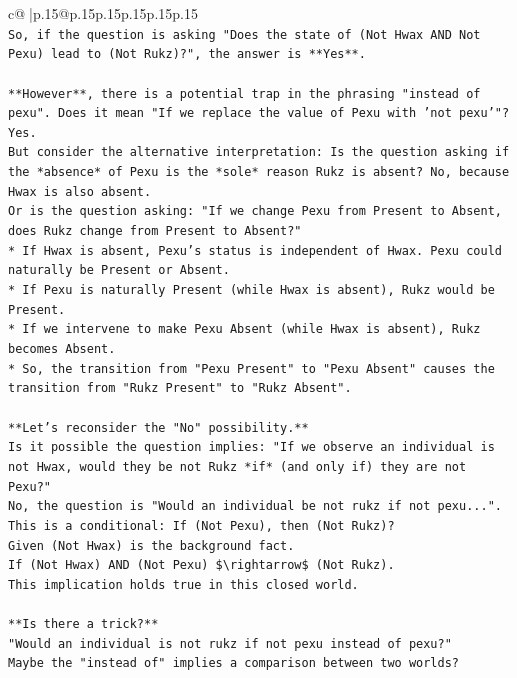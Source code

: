 \documentclass{article}
\begin{document}
{\begin{supertabular}{c@{$\;$}|p{.15\linewidth}@{}p{.15\linewidth}p{.15\linewidth}p{.15\linewidth}p{.15\linewidth}p{.15\linewidth}}
{{{\\ 
\texttt{So, if the question is asking "Does the state of (Not Hwax AND Not Pexu) lead to (Not Rukz)?", the answer is **Yes**.} \\
\\ 
\texttt{**However**, there is a potential trap in the phrasing "instead of pexu". Does it mean "If we replace the value of Pexu with 'not pexu'"? Yes.} \\
\texttt{But consider the alternative interpretation: Is the question asking if the *absence* of Pexu is the *sole* reason Rukz is absent? No, because Hwax is also absent.} \\
\texttt{Or is the question asking: "If we change Pexu from Present to Absent, does Rukz change from Present to Absent?"} \\
\texttt{*   If Hwax is absent, Pexu's status is independent of Hwax. Pexu could naturally be Present or Absent.} \\
\texttt{*   If Pexu is naturally Present (while Hwax is absent), Rukz would be Present.} \\
\texttt{*   If we intervene to make Pexu Absent (while Hwax is absent), Rukz becomes Absent.} \\
\texttt{*   So, the transition from "Pexu Present" to "Pexu Absent" causes the transition from "Rukz Present" to "Rukz Absent".} \\
\\ 
\texttt{**Let's reconsider the "No" possibility.**} \\
\texttt{Is it possible the question implies: "If we observe an individual is not Hwax, would they be not Rukz *if* (and only if) they are not Pexu?"} \\
\texttt{No, the question is "Would an individual be not rukz if not pexu...". This is a conditional: If (Not Pexu), then (Not Rukz)?} \\
\texttt{Given (Not Hwax) is the background fact.} \\
\texttt{If (Not Hwax) AND (Not Pexu) \$\textbackslash{}rightarrow\$ (Not Rukz).} \\
\texttt{This implication holds true in this closed world.} \\
\\ 
\texttt{**Is there a trick?**} \\
\texttt{"Would an individual is not rukz if not pexu instead of pexu?"} \\
\texttt{Maybe the "instead of" implies a comparison between two worlds?} \\
}}}
\end{supertabular}}
\end{document}
